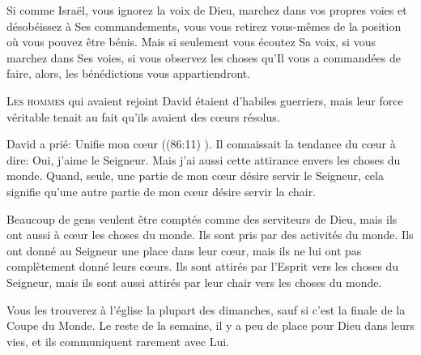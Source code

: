 Si comme Israël, vous ignorez la voix de Dieu, marchez dans vos propres voies
 et désobéissez à Ses commandements, vous vous retirez vous-mêmes
 de la position où vous pouvez être bénis. Mais si seulement
 vous écoutez Sa voix, si vous marchez dans Ses voies,
 si vous observez les choses qu'Il vous a commandées de faire, alors,
 les bénédictions vous appartiendront. 

\dvrule






\lettrine{L}{es hommes} qui avaient rejoint David
 étaient d'habiles guerriers, mais leur force véritable
 tenait au fait qu'ils avaient des c\oe{}urs résolus. 

David a prié:
 \Og Unifie mon c\oe{}ur \Fg{} ((86:11) \NBS).
 Il connaissait la tendance du c\oe{}ur à dire:
 \Og Oui, j'aime le Seigneur. Mais j'ai aussi cette attirance
 envers les choses du monde. \Fg{}
 Quand, seule, une partie de mon c\oe{}ur désire servir le Seigneur,
 cela signifie qu'une autre partie de mon c\oe{}ur désire servir la chair. 


Beaucoup de gens veulent être comptés comme des serviteurs de Dieu,
 mais ils ont aussi à c\oe{}ur les choses du monde.
 Ils sont pris par des activités du monde.
 Ils ont donné au Seigneur une place dans leur c\oe{}ur,
 mais ils ne lui ont pas complètement donné leurs c\oe{}urs.
 Ils sont attirés par l'Esprit vers les choses du Seigneur,
 mais ils sont aussi attirés par leur chair vers les choses du monde. 

Vous les trouverez à l'église la plupart des dimanches,
 sauf si c'est la finale de la Coupe du Monde. Le reste de la semaine,
 il y a peu de place pour Dieu dans leurs vies,
 et ils communiquent rarement avec Lui. 

